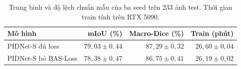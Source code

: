 \begin{table}[htbp]
\centering\small
\begin{tabularx}{\linewidth}{@{}Xrrr@{}}
\toprule
Mô hình & mIoU (\%) & Macro-Dice (\%) & Train (phút)\\
\midrule
PIDNet-S đủ loss & $79{,}03 \pm 0{,}44$ & $87{,}29 \pm 0{,}32$ & $26{,}60 \pm 0{,}04$\\
PIDNet-S bỏ BAS-Loss & $78{,}38 \pm 0{,}47$ & $86{,}75 \pm 0{,}41$ & $26{,}19 \pm 0{,}02$\\
\bottomrule
\end{tabularx}
\caption{Trung bình và độ lệch chuẩn mẫu của ba seed trên 233 ảnh test. Thời gian train tính trên RTX 5090.}
\label{tab:a2-summary}
\end{table}

